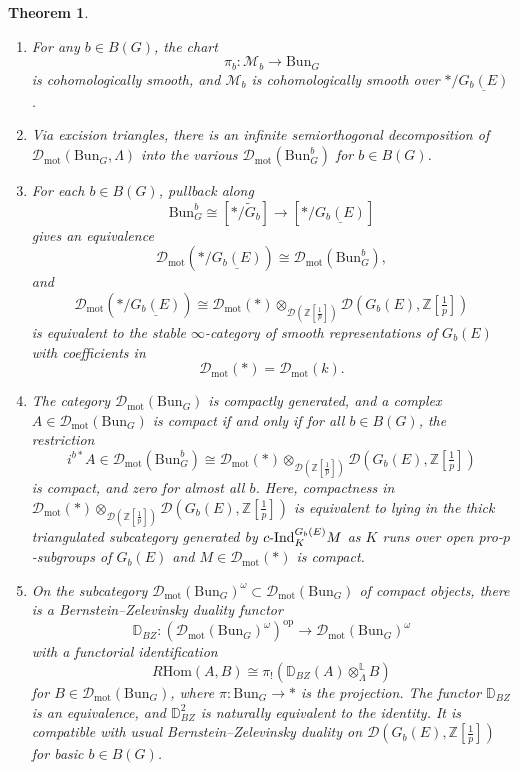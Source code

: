 \documentclass[11pt]{amsart}
\newcommand{\dotimes}{\otimes^{\mathbb L}}
\numberwithin{equation}{section}
\newtheorem{theorem}{Theorem}
\numberwithin{theorem}{section}
\theoremstyle{definition}
\newcommand{\Hom}{\mathrm{Hom}}
\newcommand{\Bun}{\mathrm{Bun}}
\begin{document}
\begin{theorem}\leavevmode
\begin{enumerate}
\item[{\rm (o)}] For any $b\in B(G)$, the chart
\[
\pi_b: \mathcal M_b\to \Bun_G
\]
is cohomologically smooth, and $\mathcal M_b$ is cohomologically smooth over $\ast/\underline{G_b(E)}$.
\item[{\rm (i)}] Via excision triangles, there is an infinite semiorthogonal decomposition of $\mathcal D_{\mathrm{mot}}(\Bun_G,\Lambda)$ into the various $\mathcal D_{\mathrm{mot}}(\Bun_G^b)$ for $b\in B(G)$.
\item[{\rm (ii)}] For each $b\in B(G)$, pullback along
\[
\Bun_G^b\cong [\ast/\tilde{G}_b]\to [\ast/\underline{G_b(E)}]
\]
gives an equivalence
\[
\mathcal D_{\mathrm{mot}}(\ast/\underline{G_b(E)})\cong \mathcal D_{\mathrm{mot}}(\Bun_G^b),
\]
and
\[
\mathcal D_{\mathrm{mot}}(\ast/\underline{G_b(E)})\cong \mathcal D_{\mathrm{mot}}(\ast)\otimes_{\mathcal D(\mathbb Z[\tfrac 1p])} \mathcal D(G_b(E),\mathbb Z[\tfrac 1p])
\]
is equivalent to the stable $\infty$-category of smooth representations of $G_b(E)$ with coefficients in
\[
\mathcal D_{\mathrm{mot}}(\ast) = \mathcal D_{\mathrm{mot}}(k).
\]
\item[{\rm (iii)}] The category $\mathcal D_{\mathrm{mot}}(\Bun_G)$ is compactly generated, and a complex $A\in \mathcal D_{\mathrm{mot}}(\Bun_G)$ is compact if and only if for all $b\in B(G)$, the restriction
\[
i^{b\ast} A\in \mathcal D_{\mathrm{mot}}(\Bun_G^b)\cong \mathcal D_{\mathrm{mot}}(\ast)\otimes_{\mathcal D(\mathbb Z[\tfrac 1p])} \mathcal D(G_b(E),\mathbb Z[\tfrac 1p])
\]
is compact, and zero for almost all $b$. Here, compactness in $\mathcal D_{\mathrm{mot}}(\ast)\otimes_{\mathcal D(\mathbb Z[\tfrac 1p])} \mathcal D(G_b(E),\mathbb Z[\tfrac 1p])$ is equivalent to lying in the thick triangulated subcategory generated by $c\text-\mathrm{Ind}_K^{G_b(E)} M$ as $K$ runs over open pro-$p$-subgroups of $G_b(E)$ and $M\in \mathcal D_{\mathrm{mot}}(\ast)$ is compact.
\item[{\rm (iv)}] On the subcategory $\mathcal D_{\mathrm{mot}}(\Bun_G)^\omega\subset \mathcal D_{\mathrm{mot}}(\Bun_G)$ of compact objects, there is a Bernstein--Zelevinsky duality functor
\[
\mathbb D_{BZ}: (\mathcal D_{\mathrm{mot}}(\Bun_G)^\omega)^{\mathrm{op}}\to \mathcal D_{\mathrm{mot}}(\Bun_G)^\omega
\]
with a functorial identification
\[
R\Hom(A,B)\cong \pi_!(\mathbb D_{BZ}(A)\dotimes_\Lambda B)
\]
for $B\in \mathcal D_{\mathrm{mot}}(\Bun_G)$, where $\pi: \Bun_G\to \ast$ is the projection. The functor $\mathbb D_{BZ}$ is an equivalence, and $\mathbb D_{BZ}^2$ is naturally equivalent to the identity. It is compatible with usual Bernstein--Zelevinsky duality on $\mathcal D(G_b(E),\mathbb Z[\tfrac 1p])$ for basic $b\in B(G)$.

\end{enumerate}
\end{theorem}
\end{document}
